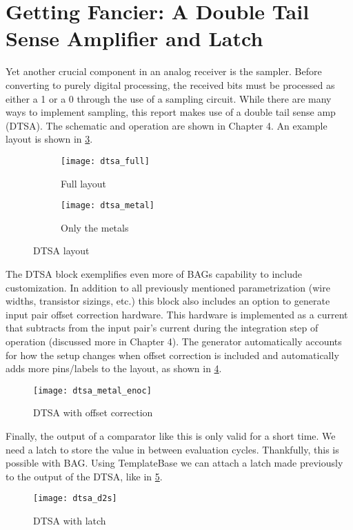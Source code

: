 \section{Getting Fancier: A Double Tail Sense Amplifier and Latch}
Yet another crucial component in an analog receiver is the sampler. Before converting to purely digital processing, the received bits must be processed as either a 1 or a 0 through the use of a sampling circuit. While there are many ways to implement sampling, this report makes use of a double tail sense amp (DTSA). The schematic and operation are shown in Chapter 4. An example layout is shown in \ref{fig:dtsa_ex}.
\begin{figure}[h]
\centering
\begin{subfigure}{.4\linewidth}
  \centering
  \texttt{[image: dtsa\_full]}
  \caption{Full layout}
  \label{fig:sfig1}
\end{subfigure}
\begin{subfigure}{.4\linewidth}
  \centering
\texttt{[image: dtsa\_metal]}
  \caption{Only the metals}
  \label{fig:sfig2}
\end{subfigure}
\caption{DTSA layout}
\label{fig:dtsa_ex}
\end{figure}
The DTSA block exemplifies even more of BAGs capability to include customization. In addition to all previously mentioned parametrization (wire widths, transistor sizings, etc.) this block also includes an option to generate input pair offset correction hardware. This hardware is implemented as a current that subtracts from the input pair's current during the integration step of operation (discussed more in  Chapter 4). The generator automatically accounts for how the setup changes when offset correction is included and automatically adds more pins/labels to the layout, as shown in \ref{fig:dtsa_enoc}.
\begin{figure}[h]
\centering
\texttt{[image: dtsa\_metal\_enoc]}
\caption{DTSA with offset correction}
\label{fig:dtsa_enoc}
\end{figure}
Finally, the output of a comparator like this is only valid for a short time. We need a latch to store the value in between evaluation cycles. Thankfully, this is possible with BAG. Using TemplateBase we can attach a latch made previously to the output of the DTSA, like in \ref{fig:dtsa_d2s}.
\begin{figure}[h]
\centering
\texttt{[image: dtsa\_d2s]}
\caption{DTSA with latch}
\label{fig:dtsa_d2s}
\end{figure}

